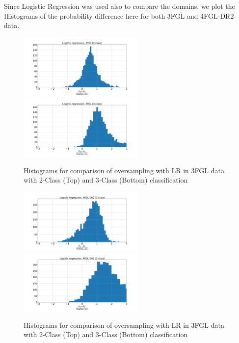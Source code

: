 Since Logistic Regression was used also to compare the domains, we plot the Histograms of the probability difference here for both 3FGL and 4FGL-DR2 data.
\begin{figure}[h]
\centering
\hspace*{-0.5cm}
\includegraphics[width=0.55\textwidth]{plots/hist_diff_smote_LR_3FGL_2class.pdf}
\hspace*{-0.5cm}
\includegraphics[width=0.55\textwidth]{plots/hist_diff_smote_LR_3FGL_3class.pdf}
\caption{Histograms for comparison of oversampling with LR in 3FGL data with 2-Class (Top) and 3-Class (Bottom) classification
}
\label{fig:nn_nn}
\end{figure}

\begin{figure}[h]
\centering
\hspace*{-0.5cm}
\includegraphics[width=0.55\textwidth]{plots/hist_diff_smote_LR_4FGL-DR2_2class.pdf}
\hspace*{-0.5cm}
\includegraphics[width=0.55\textwidth]{plots/hist_diff_smote_LR_4FGL-DR2_3class.pdf}
\caption{Histograms for comparison of oversampling with LR in 3FGL data with 2-Class (Top) and 3-Class (Bottom) classification
}
\label{fig:nn_nn}
\end{figure}

